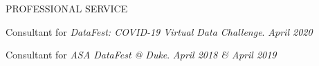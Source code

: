 \documentclass{resume} %
\begin{document}
\begin{rSection}{PROFESSIONAL SERVICE}





\smallskip

Consultant for \emph{DataFest: COVID-19 Virtual Data Challenge}.  \hfill {\em April 2020}



\smallskip

Consultant for \emph{ASA DataFest @ Duke}. \hfill {\em April 2018 \& April 2019}
\end{rSection}
\end{document}

